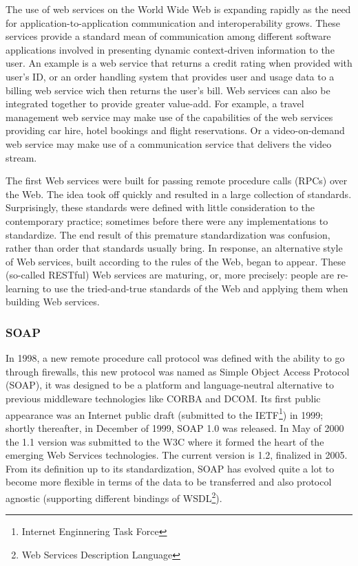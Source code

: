The use of web services on the World Wide Web is expanding rapidly as the need for application-to-application communication and interoperability grows. These services provide a standard mean of communication among different software applications involved in presenting dynamic context-driven information to the user\cite{Austin:2004}. An example is a web service that returns a credit rating when provided with user's ID, or an order handling system that provides user and usage data to a billing web service wich then returns the user's bill. Web services can also be integrated together to provide greater value-add. For example, a travel management web service may make use of the capabilities of the web services providing car hire, hotel bookings and flight reservations. Or a video-on-demand web service may make use of a communication service that delivers the video stream.

The first Web services were built for passing remote procedure calls (RPCs) over the Web. The idea took off quickly and resulted in a large collection of standards. Surprisingly, these standards were defined with little consideration to the contemporary practice; sometimes before there were any implementations to standardize. The end result of this premature standardization was confusion, rather than order that standards usually bring. In response, an alternative style of Web services, built according to the rules of the Web, began to appear. These (so-called RESTful) Web services are maturing, or, more precisely: people are re-learning to use the tried-and-true standards of the Web and applying them when building Web services.

\subsubsection{SOAP}
In 1998, a new remote procedure call protocol was defined with the ability to go through firewalls, this new protocol was named as Simple Object Access Protocol (SOAP), it was designed to be a platform and language-neutral alternative to previous middleware technologies like CORBA and DCOM. Its first public appearance was an Internet public draft (submitted to the IETF\footnote{Internet Enginnering Task Force}) in 1999; shortly thereafter, in December of 1999, SOAP 1.0 was released. In May of 2000 the 1.1 version was submitted to the W3C where it formed the heart of the emerging Web Services technologies. The current version is 1.2, finalized in 2005. From its definition up to its standardization, SOAP has evolved quite a lot to become more flexible in terms of the data to be transferred and also protocol agnostic (supporting different bindings of WSDL\footnote{Web Services Description Language})\cite{Pautasso:2007}.

